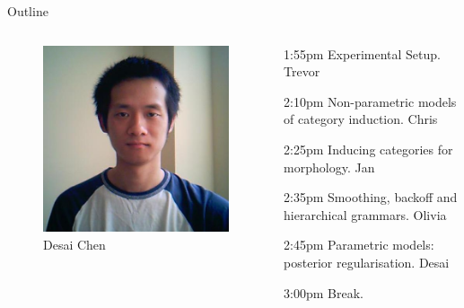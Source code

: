\documentclass{beamer}
\newenvironment{unpacked_itemize}{
\begin{itemize}
  \setlength{\itemsep}{10pt}
  \setlength{\parskip}{0pt}
  \setlength{\parsep}{0pt}
}{\end{itemize}}
\begin{document}
\begin{frame}[t]{Outline}
\begin{columns}
\begin{column}{0.2\textwidth}
\begin{exampleblock}{}
\begin{figure}
        {\centering \includegraphics[scale=0.10]{desai.jpg}}\\
        Desai Chen\\

      \end{figure}
    \end{exampleblock}
  \vspace{0.25in}
  \end{column}
  \begin{column}{0.7\textwidth}
    \begin{unpacked_itemize}
      \item 1:55pm Experimental Setup. Trevor
      \item 2:10pm Non-parametric models of category induction. Chris
      \item 2:25pm Inducing categories for morphology. Jan
      \item 2:35pm Smoothing, backoff and hierarchical grammars. Olivia
      \item 2:45pm Parametric models: posterior regularisation. Desai
      \item 3:00pm Break.
    \end{unpacked_itemize}
  \end{column}
\end{columns}
\end{frame}
\end{document}
